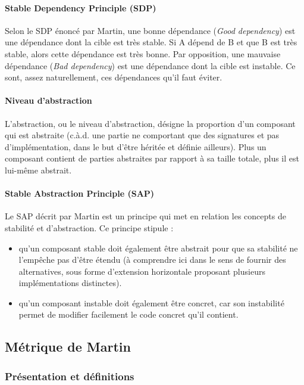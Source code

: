 \documentclass{scrartcl}
\begin{document}
    \paragraph{Stable Dependency Principle (SDP)}Selon le SDP énoncé par Martin\cite{Martin:2003}, une bonne dépendance (\emph{Good dependency}) est une dépendance dont la cible est très stable. Si A dépend de B et que B est très stable, alors cette dépendance est très bonne. Par opposition, une mauvaise dépendance (\emph{Bad dependency}) est une dépendance dont la cible est instable. Ce sont, assez naturellement, ces dépendances qu'il faut éviter.
   
    \paragraph{Niveau d'abstraction}L'abstraction, ou le niveau d'abstraction, désigne la proportion d'un composant qui est abstraite (c.à.d. une partie ne comportant que des signatures et pas d'implémentation, dans le but d'être héritée et définie ailleurs). Plus un composant contient de parties abstraites par rapport à sa taille totale, plus il est lui-même abstrait.
    

    \paragraph{Stable Abstraction Principle (SAP)}Le SAP décrit par Martin\cite{Martin:2003} est un principe qui met en relation les concepts de stabilité et d'abstraction. Ce principe stipule :
    \begin{itemize}
        \item qu'un composant stable doit également être abstrait pour que sa stabilité ne l'empêche pas d'être étendu (à comprendre ici dans le sens de fournir des alternatives, sous forme d'extension horizontale proposant plusieurs implémentations distinctes). 
        \item qu'un composant instable doit également être concret, car son instabilité permet de modifier facilement le code concret qu'il contient.
    \end{itemize}

    
\subsection{Métrique de Martin}
\subsubsection{Présentation et définitions}
\end{document}
